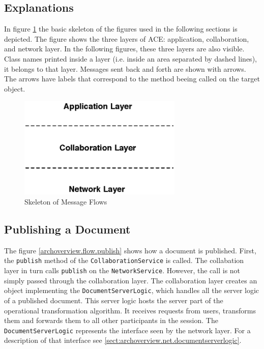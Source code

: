 \subsection{Explanations}
In figure \ref{fig:archoverview.flow.skeleton} the basic skeleton of the
figures used in the following sections is depicted. The figure shows the
three layers of ACE: application, collaboration, and network layer. In 
the following figures, these three layers are also visible. Class names
printed inside a layer (i.e. inside an area separated by dashed lines), it
belongs to that layer. Messages sent back and forth are shown with arrows. The
arrows have labels that correspond to the method beeing called on the target
object.

\begin{figure}[H]
 \centering
 \includegraphics[width=7.80cm,height=4.87cm]{../images/finalreport/architecture_flows/skeleton.eps}
 \caption{Skeleton of Message Flows}
 \label{fig:archoverview.flow.skeleton}
\end{figure}


\subsection{Publishing a Document}
The figure \ref{archoverview.flow.publish} shows how a document is published.
First, the \texttt{publish} method of the \texttt{CollaborationService} is 
called. The collabation layer in turn calls \texttt{publish} on the
\texttt{NetworkService}. However, the call is not simply passed through the
collaboration layer. The collaboration layer creates an object implementing
the \texttt{DocumentServerLogic}, which handles all the server logic of a
published document. This server logic hosts the server part of the
operational transformation algorithm. It receives requests from users, 
transforms them and forwards them to all other participants in the session.
The \texttt{DocumentServerLogic} represents the interface seen by the
network layer. For a description of that interface see 
\ref{sect:archoverview.net.documentserverlogic}.

